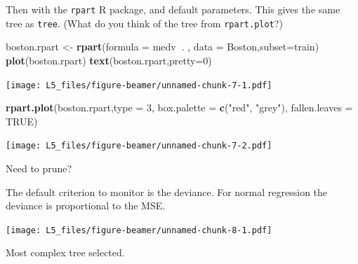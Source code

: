 \documentclass[
  ignorenonframetext,
]{beamer}
\newenvironment{Shaded}{\begin{snugshade}}{\end{snugshade}}
\newcommand{\DataTypeTok}[1]{\textcolor[rgb]{0.13,0.29,0.53}{#1}}
\newcommand{\DecValTok}[1]{\textcolor[rgb]{0.00,0.00,0.81}{#1}}
\newcommand{\KeywordTok}[1]{\textcolor[rgb]{0.13,0.29,0.53}{\textbf{#1}}}
\newcommand{\NormalTok}[1]{#1}
\newcommand{\OperatorTok}[1]{\textcolor[rgb]{0.81,0.36,0.00}{\textbf{#1}}}
\newcommand{\OtherTok}[1]{\textcolor[rgb]{0.56,0.35,0.01}{#1}}
\newcommand{\StringTok}[1]{\textcolor[rgb]{0.31,0.60,0.02}{#1}}
\begin{document}
\begin{frame}[fragile]

Then with the \texttt{rpart} R package, and default parameters. This
gives the same tree as \texttt{tree}. (What do you think of the tree
from \texttt{rpart.plot}?)

\begin{Shaded}
\begin{Highlighting}[]
\NormalTok{boston.rpart <-}\StringTok{ }\KeywordTok{rpart}\NormalTok{(}\DataTypeTok{formula =}\NormalTok{ medv}\OperatorTok{~}\NormalTok{. , }\DataTypeTok{data =}\NormalTok{ Boston,}\DataTypeTok{subset=}\NormalTok{train)}
\KeywordTok{plot}\NormalTok{(boston.rpart)}
\KeywordTok{text}\NormalTok{(boston.rpart,}\DataTypeTok{pretty=}\DecValTok{0}\NormalTok{)}
\end{Highlighting}
\end{Shaded}

\texttt{[image: L5\_files/figure-beamer/unnamed-chunk-7-1.pdf]}

\begin{Shaded}
\begin{Highlighting}[]
\KeywordTok{rpart.plot}\NormalTok{(boston.rpart,}\DataTypeTok{type =} \DecValTok{3}\NormalTok{, }\DataTypeTok{box.palette =} \KeywordTok{c}\NormalTok{(}\StringTok{"red"}\NormalTok{, }\StringTok{"grey"}\NormalTok{), }\DataTypeTok{fallen.leaves =} \OtherTok{TRUE}\NormalTok{)}
\end{Highlighting}
\end{Shaded}

\texttt{[image: L5\_files/figure-beamer/unnamed-chunk-7-2.pdf]}

\end{frame}

\begin{frame}[fragile]

\begin{block}{Need to prune?}

The default criterion to monitor is the deviance. For normal regression
the deviance is proportional to the MSE.

\begin{Shaded}
\end{Shaded}

\texttt{[image: L5\_files/figure-beamer/unnamed-chunk-8-1.pdf]}

Most complex tree selected.

\end{block}

\end{frame}
\end{document}
